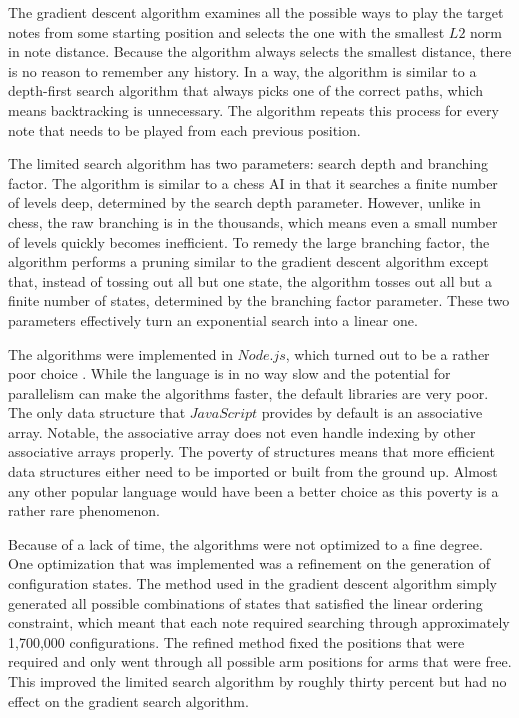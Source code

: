 \documentclass[letterpaper, 10 pt, conference]{ieeeconf}  %
\begin{document}
The gradient descent algorithm examines all the possible ways to play the target notes from some starting position and selects the one with the smallest $L2$ norm in note distance. Because the algorithm always selects the smallest distance, there is no reason to remember any history. In a way, the algorithm is similar to a depth-first search algorithm that always picks one of the correct paths, which means backtracking is unnecessary.  The algorithm repeats this process for every note that needs to be played from each previous position.

The limited search algorithm has two parameters: search depth and branching factor. The algorithm is similar to a chess AI in that it searches a finite number of levels deep, determined by the search depth parameter. However, unlike in chess, the raw branching is in the thousands, which means even a small number of levels quickly becomes inefficient. To remedy the large branching factor, the algorithm performs a pruning similar to the gradient descent algorithm except that, instead of tossing out all but one state, the algorithm tosses out all but a finite number of states, determined by the branching factor parameter. These two parameters effectively turn an exponential search into a linear one.

The algorithms were implemented in $Node.js$, which turned out to be a rather poor choice \cite{NodeJs}. While the language is in no way slow and the potential for parallelism can make the algorithms faster, the default libraries are very poor. The only data structure that $JavaScript$ provides by default is an associative array. Notable, the associative array does not even handle indexing by other associative arrays properly. The poverty of structures means that more efficient data structures either need to be imported or built from the ground up. Almost any other popular language would have been a better choice as this poverty is a rather rare phenomenon.

Because of a lack of time, the algorithms were not optimized to a fine degree. One optimization that was implemented was a refinement on the generation of configuration states. The method used in the gradient descent algorithm simply generated all possible combinations of states that satisfied the linear ordering constraint, which meant that each note required searching through approximately 1,700,000 configurations. The refined method fixed the positions that were required and only went through all possible arm positions for arms that were free. This improved the limited search algorithm by roughly thirty percent but had no effect on the gradient search algorithm. 
\end{document}
